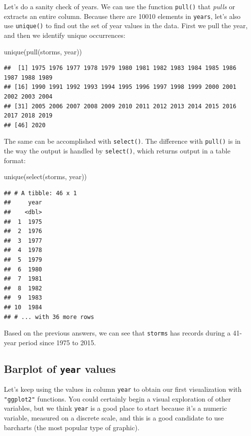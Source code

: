 \documentclass[
]{book}
\newenvironment{Shaded}{\begin{snugshade}}{\end{snugshade}}
\newcommand{\FunctionTok}[1]{\textcolor[rgb]{0.00,0.00,0.00}{#1}}
\newcommand{\NormalTok}[1]{#1}
\begin{document}
Let's do a sanity check of years. We can use the function \texttt{pull()} that \emph{pulls}
or extracts an entire column. Because there are 10010 elements in
\texttt{years}, let's also use \texttt{unique()} to find out the set of year values in the
data. First we pull the year, and then we identify unique occurrences:

\begin{Shaded}
\begin{Highlighting}[]
\FunctionTok{unique}\NormalTok{(}\FunctionTok{pull}\NormalTok{(storms, year))}
\end{Highlighting}
\end{Shaded}

\begin{verbatim}
##  [1] 1975 1976 1977 1978 1979 1980 1981 1982 1983 1984 1985 1986 1987 1988 1989
## [16] 1990 1991 1992 1993 1994 1995 1996 1997 1998 1999 2000 2001 2002 2003 2004
## [31] 2005 2006 2007 2008 2009 2010 2011 2012 2013 2014 2015 2016 2017 2018 2019
## [46] 2020
\end{verbatim}

The same can be accomplished with \texttt{select()}. The difference with \texttt{pull()} is
in the way the output is handled by \texttt{select()}, which returns output in a table
format:

\begin{Shaded}
\begin{Highlighting}[]
\FunctionTok{unique}\NormalTok{(}\FunctionTok{select}\NormalTok{(storms, year))}
\end{Highlighting}
\end{Shaded}

\begin{verbatim}
## # A tibble: 46 x 1
##     year
##    <dbl>
##  1  1975
##  2  1976
##  3  1977
##  4  1978
##  5  1979
##  6  1980
##  7  1981
##  8  1982
##  9  1983
## 10  1984
## # ... with 36 more rows
\end{verbatim}

Based on the previous answers, we can see that \texttt{storms} has records during
a 41-year period since 1975 to 2015.

\hypertarget{barplot-of-year-values}{%
\subsection{\texorpdfstring{Barplot of \texttt{year} values}{Barplot of year values}}\label{barplot-of-year-values}}

Let's keep using the values in column \texttt{year} to obtain our first visualization
with \texttt{"ggplot2"} functions. You could certainly begin a visual exploration of
other variables, but we think \texttt{year} is a good place to start because it's a
numeric variable, measured on a discrete scale, and this is a good candidate
to use barcharts (the most popular type of graphic).
\end{document}
